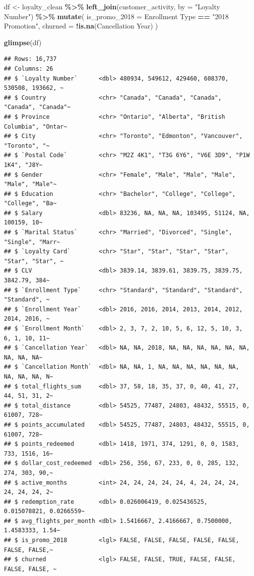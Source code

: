 \documentclass[
]{article}
\newenvironment{Shaded}{\begin{snugshade}}{\end{snugshade}}
\newcommand{\AttributeTok}[1]{\textcolor[rgb]{0.13,0.29,0.53}{#1}}
\newcommand{\FunctionTok}[1]{\textcolor[rgb]{0.13,0.29,0.53}{\textbf{#1}}}
\newcommand{\NormalTok}[1]{#1}
\newcommand{\OtherTok}[1]{\textcolor[rgb]{0.56,0.35,0.01}{#1}}
\newcommand{\SpecialCharTok}[1]{\textcolor[rgb]{0.81,0.36,0.00}{\textbf{#1}}}
\newcommand{\StringTok}[1]{\textcolor[rgb]{0.31,0.60,0.02}{#1}}
\begin{document}
\begin{Shaded}
\begin{Highlighting}[]
\NormalTok{df }\OtherTok{\textless{}{-}}\NormalTok{ loyalty\_clean }\SpecialCharTok{\%\textgreater{}\%}
  \FunctionTok{left\_join}\NormalTok{(customer\_activity, }\AttributeTok{by =} \StringTok{"Loyalty Number"}\NormalTok{) }\SpecialCharTok{\%\textgreater{}\%}
  \FunctionTok{mutate}\NormalTok{(}
    \AttributeTok{is\_promo\_2018 =} \StringTok{\textasciigrave{}}\AttributeTok{Enrollment Type}\StringTok{\textasciigrave{}} \SpecialCharTok{==} \StringTok{"2018 Promotion"}\NormalTok{,}
    \AttributeTok{churned =} \SpecialCharTok{!}\FunctionTok{is.na}\NormalTok{(}\StringTok{\textasciigrave{}}\AttributeTok{Cancellation Year}\StringTok{\textasciigrave{}}\NormalTok{)}
\NormalTok{  )}

\FunctionTok{glimpse}\NormalTok{(df)}
\end{Highlighting}
\end{Shaded}

\begin{verbatim}
## Rows: 16,737
## Columns: 26
## $ `Loyalty Number`      <dbl> 480934, 549612, 429460, 608370, 530508, 193662, ~
## $ Country               <chr> "Canada", "Canada", "Canada", "Canada", "Canada"~
## $ Province              <chr> "Ontario", "Alberta", "British Columbia", "Ontar~
## $ City                  <chr> "Toronto", "Edmonton", "Vancouver", "Toronto", "~
## $ `Postal Code`         <chr> "M2Z 4K1", "T3G 6Y6", "V6E 3D9", "P1W 1K4", "J8Y~
## $ Gender                <chr> "Female", "Male", "Male", "Male", "Male", "Male"~
## $ Education             <chr> "Bachelor", "College", "College", "College", "Ba~
## $ Salary                <dbl> 83236, NA, NA, NA, 103495, 51124, NA, 100159, 10~
## $ `Marital Status`      <chr> "Married", "Divorced", "Single", "Single", "Marr~
## $ `Loyalty Card`        <chr> "Star", "Star", "Star", "Star", "Star", "Star", ~
## $ CLV                   <dbl> 3839.14, 3839.61, 3839.75, 3839.75, 3842.79, 384~
## $ `Enrollment Type`     <chr> "Standard", "Standard", "Standard", "Standard", ~
## $ `Enrollment Year`     <dbl> 2016, 2016, 2014, 2013, 2014, 2012, 2014, 2016, ~
## $ `Enrollment Month`    <dbl> 2, 3, 7, 2, 10, 5, 6, 12, 5, 10, 3, 6, 1, 10, 11~
## $ `Cancellation Year`   <dbl> NA, NA, 2018, NA, NA, NA, NA, NA, NA, NA, NA, NA~
## $ `Cancellation Month`  <dbl> NA, NA, 1, NA, NA, NA, NA, NA, NA, NA, NA, NA, N~
## $ total_flights_sum     <dbl> 37, 58, 18, 35, 37, 0, 40, 41, 27, 44, 51, 31, 2~
## $ total_distance        <dbl> 54525, 77487, 24803, 48432, 55515, 0, 61007, 728~
## $ points_accumulated    <dbl> 54525, 77487, 24803, 48432, 55515, 0, 61007, 728~
## $ points_redeemed       <dbl> 1418, 1971, 374, 1291, 0, 0, 1583, 733, 1516, 16~
## $ dollar_cost_redeemed  <dbl> 256, 356, 67, 233, 0, 0, 285, 132, 274, 303, 90,~
## $ active_months         <int> 24, 24, 24, 24, 24, 4, 24, 24, 24, 24, 24, 24, 2~
## $ redemption_rate       <dbl> 0.026006419, 0.025436525, 0.015078821, 0.0266559~
## $ avg_flights_per_month <dbl> 1.5416667, 2.4166667, 0.7500000, 1.4583333, 1.54~
## $ is_promo_2018         <lgl> FALSE, FALSE, FALSE, FALSE, FALSE, FALSE, FALSE,~
## $ churned               <lgl> FALSE, FALSE, TRUE, FALSE, FALSE, FALSE, FALSE, ~
\end{verbatim}
\end{document}
